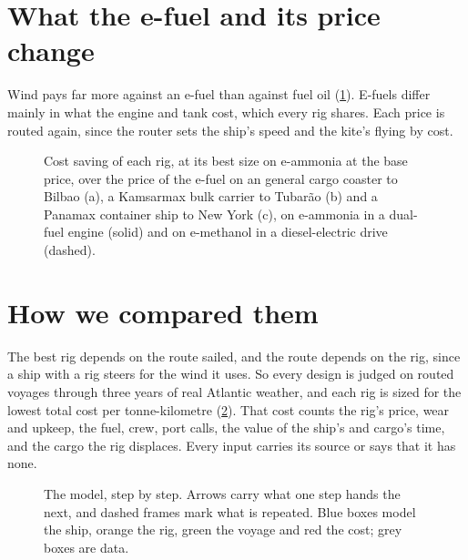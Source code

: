 \documentclass[10pt,a4paper]{article}
\begin{document}
\section{What the e-fuel and its price change}

Wind pays far more against an e-fuel than against fuel oil (\cref{ea:fuels}).  E-fuels differ mainly in what the engine and tank cost, which every rig shares. Each price is routed again, since the router sets the ship's speed and the kite's flying by cost.

\begin{figure}[!htb]
\centering
{}
\caption{ Cost saving of each rig, at its best size on e-ammonia at the base price, over the price of the e-fuel on an  general cargo coaster to Bilbao (a), a Kamsarmax bulk carrier to Tubarão (b) and a Panamax container ship to New York (c), on e-ammonia in a dual-fuel engine (solid) and on e-methanol in a diesel-electric drive (dashed).}
\label{ea:fuels}
\end{figure}

\section{How we compared them}

The best rig depends on the route sailed, and the route depends on the rig, since a ship with a rig steers for the wind it uses. So every design is judged on routed voyages through three years of real Atlantic weather, and each rig is sized for the lowest total cost per tonne-kilometre (\cref{ea:pipeline}). That cost counts the rig's price, wear and upkeep, the fuel, crew, port calls, the value of the ship's and cargo's time, and the cargo the rig displaces. Every input carries its source or says that it has none.

\begin{figure}[!htb]
\centering
{}
\caption{The model, step by step. Arrows carry what one step hands the next, and dashed frames mark what is repeated. Blue boxes model the ship, orange the rig, green the voyage and red the cost; grey boxes are data.}
\label{ea:pipeline}
\end{figure}
\end{document}
